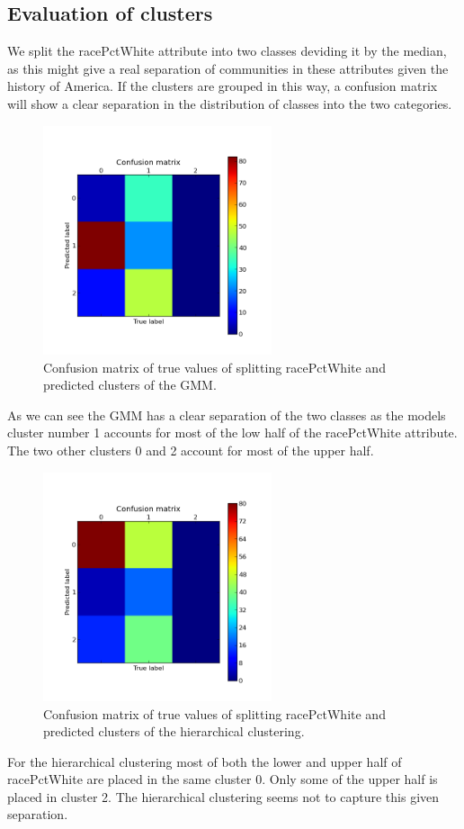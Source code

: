 \documentclass[a4paper,10pt]{article}
\begin{document}
\subsection{Evaluation of clusters}
We split the racePctWhite attribute into two classes deviding it by the median, as this might give a real separation of communities in these attributes given the history of America. If the clusters are grouped in this way, a confusion matrix will show a clear separation in the distribution of classes into the two categories.
\begin{figure}[H]
\centering
\includegraphics[h, width=0.6\textwidth]{figure_4}
\caption{Confusion matrix of true values of splitting racePctWhite and predicted clusters of the GMM.}
\end{figure}
As we can see the GMM has a clear separation of the two classes as the models cluster number 1 accounts for most of the low half of the racePctWhite attribute. The two other clusters 0 and 2 account for most of the upper half.

\begin{figure}[H]
\centering
\includegraphics[h, width=0.6\textwidth]{figure_5}
\caption{Confusion matrix of true values of splitting racePctWhite and predicted clusters of the hierarchical clustering.}
\end{figure}
For the hierarchical clustering most of both the lower and upper half of racePctWhite are placed in the same cluster 0. Only some of the upper half is placed in cluster 2. The hierarchical clustering seems not to capture this given separation.
\end{document}
